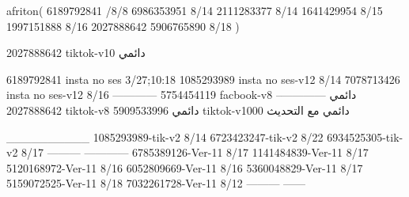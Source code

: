 afriton(
6189792841 /8/8
6986353951 8/14
2111283377 8/14
1641429954 8/15
1997151888 8/16
2027888642
5906765890 8/18
)

2027888642 tiktok-v10
دائمي

6189792841 insta no ses
3/27;10:18
1085293989 insta no ses-v12
8/14
7078713426 insta no ses-v12
8/16
------------
5754454119 facbook-v8
دائمي
--------------
2027888642 tiktok-v8
دائمي
5909533996 tiktok-v1000
دائمي مع التحديث

__________
1085293989-tik-v2
8/14
6723423247-tik-v2
8/22
6934525305-tik-v2
8/17
---------
------------
6785389126-Ver-11
8/17
1141484839-Ver-11
8/17
5120168972-Ver-11
8/16
6052809669-Ver-11
8/16
5360048829-Ver-11
8/17
5159072525-Ver-11
8/18
7032261728-Ver-11
8/12
---------
------
